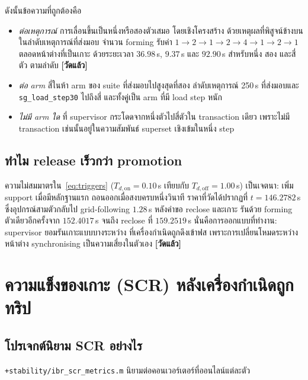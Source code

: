 \documentclass[12pt,a4paper]{article}
\theoremstyle{remark}
\newcommand{\code}[1]{\texttt{\small #1}}
\newcommand{\measured}{\textcolor{ok}{\textbf{[วัดแล้ว]}}}
\begin{document}
ดังนั้นข้อความที่ถูกต้องคือ

\begin{itemize}
\item \emph{ต่อเหตุการณ์} การเลื่อนขึ้นเป็นหนึ่งหรือสองตัวเสมอ โดยเชิงโครงสร้าง
      ด้วยเหตุผลที่พิสูจน์ข้างบน ในลำดับเหตุการณ์ที่ส่งมอบ จำนวน forming
      รับค่า $1 \to 2 \to 1 \to 2 \to 4 \to 1 \to 2 \to 1$ ตลอดหน้าต่างที่เป็นเกาะ
      ด้วยระยะเวลา $36.98$\,s, $9.37$\,s และ $92.90$\,s สำหรับหนึ่ง สอง และสี่ตัว
      ตามลำดับ \measured
\item \emph{ต่อ arm} สี่ในห้า arm ของ suite ที่ส่งมอบไปสูงสุดที่สอง ลำดับเหตุการณ์
      250\,s ที่ส่งมอบและ \code{sg\_load\_step30} ไปถึงสี่ และทั้งคู่เป็น arm
      ที่มี load step หนัก
\item \emph{ไม่มี arm ใด} ที่ supervisor กระโดดจากหนึ่งตัวไปสี่ตัวใน
      transaction เดียว เพราะไม่มี transaction เช่นนั้นอยู่ในความสัมพันธ์
      superset เชิงเข้มในหนึ่ง step
\end{itemize}

\subsection{ทำไม release เร็วกว่า promotion}

ความไม่สมมาตรใน~\eqref{eq:triggers} ($T_{d,\mathrm{on}} = 0.10$\,s เทียบกับ
$T_{d,\mathrm{off}} = 1.00$\,s) เป็นเจตนา: เพิ่ม support เมื่อมีหลักฐานแรก
ถอนออกเมื่อสงบครบหนึ่งวินาที ราคาที่วัดได้ปรากฏที่ $t = 146.2782$\,s
ซึ่งอุปกรณ์สามตัวกลับไป grid-following $1.28$\,s หลังคำขอ reclose และเกาะ
รันด้วย forming ตัวเดียวอีกครั้งจาก $152.4017$\,s จนถึง reclose ที่
$159.2519$\,s นั่นคือการออกแบบที่ทำงาน: supervisor ยอมรันเกาะแบบบางระหว่าง
ที่เครื่องกำเนิดถูกดึงเข้าฟส เพราะการเปลี่ยนโหมดระหว่างหน้าต่าง synchronising
เป็นความเสี่ยงในตัวเอง \measured

\section{ความแข็งของเกาะ (SCR) หลังเครื่องกำเนิดถูกทริป}\label{sec:scr}

\subsection{โปรเจกต์นิยาม SCR อย่างไร}

\code{+stability/ibr\_scr\_metrics.m} นิยามต่อคอนเวอร์เตอร์ที่ออนไลน์แต่ละตัว
\end{document}
